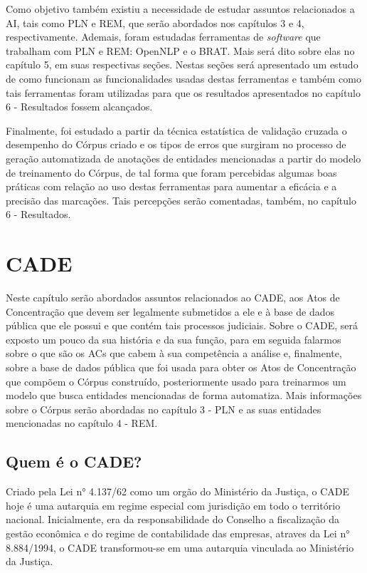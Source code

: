 \documentclass[11pt]{report}
\begin{document}
Como objetivo também existiu a necessidade de estudar assuntos relacionados a AI, tais como PLN e REM, que serão abordados nos capítulos 3 e 4, respectivamente.
Ademais, foram estudadas ferramentas de \textit{software} que trabalham com PLN e REM: OpenNLP e o BRAT. Mais será dito sobre elas no capítulo 5, em suas
respectivas seções. Nestas seções será apresentado um estudo de como funcionam as funcionalidades usadas destas ferramentas e também como tais ferramentas foram
utilizadas para que os resultados apresentados no capítulo 6 - Resultados fossem alcançados.

Finalmente, foi estudado a partir da técnica estatística de validação cruzada o desempenho do Córpus criado e os tipos de erros que surgiram no processo de geração automatizada
de anotações de entidades mencionadas a partir do modelo de treinamento do Córpus, de tal forma que foram percebidas algumas boas práticas com relação ao uso destas ferramentas
para aumentar a eficácia e a precisão das marcações. Tais percepções serão comentadas, também, no capítulo 6 - Resultados.

\pagebreak
\chapter{CADE}

\indent\indent Neste capítulo serão abordados assuntos relacionados ao CADE, aos Atos de Concentração que devem ser legalmente submetidos a ele e à base de dados pública que ele possui e
que contém tais processos judiciais. Sobre o CADE, será exposto um pouco da sua história e da sua função, para em seguida falarmos sobre o que são os ACs que cabem à sua competência
a análise e, finalmente, sobre a base de dados pública que foi usada para obter os Atos de Concentração que compõem o Córpus construído, posteriormente usado para treinarmos um modelo
que busca entidades mencionadas de forma automatiza. Mais informações sobre o Córpus serão abordadas no capítulo 3 - PLN e as suas entidades mencionadas no capítulo 4 - REM.

\section{Quem é o CADE?}

\indent\indent Criado pela Lei n° 4.137/62 como um orgão do Ministério da Justiça, o CADE hoje é uma autarquia em regime especial com jurisdição em todo o território nacional. Inicialmente,
era da responsabilidade do Conselho a fiscalização da gestão econômica e do regime de contabilidade das empresas, atraves da Lei n° 8.884/1994, o CADE transformou-se em uma
autarquia vinculada ao Ministério da Justiça.
\end{document}
